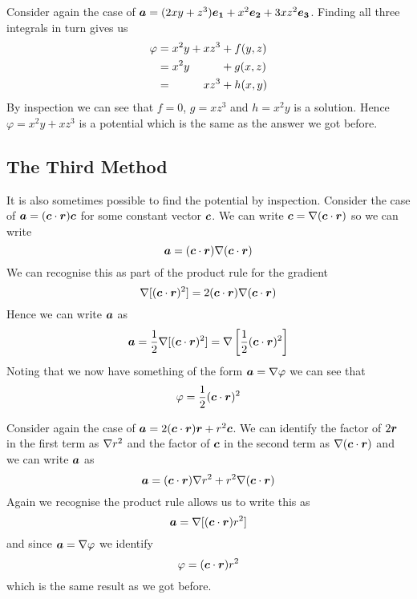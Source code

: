 \documentclass{article}
\begin{document}
    \example
    Consider again the case of \(\bm{a} = (2xy + z^3)\bm{e_{1}} + x^2\bm{e_{2}} + 3xz^2\bm{e_{3}}\).
    Finding all three integrals in turn gives us
    \begin{align*}
        \varphi &= x^2y + xz^3 + f(y, z)\\
        &= x^2y \hphantom{ + xz^3 }\;\, + g(x, z)\\
        &= \hphantom{x^2y + }\;\, xz^3 + h(x, y)
    \end{align*}
    By inspection we can see that \(f = 0\), \(g = xz^3\) and \(h = x^2y\) is a solution.
    Hence \(\varphi = x^2y + xz^3\) is a potential which is the same as the answer we got before.
    
    \subsection{The Third Method}
    It is also sometimes possible to find the potential by inspection.
    \example
    Consider the case of \(\bm{a} = (\bm{c}\cdot\bm{r})\bm{c}\) for some constant vector \(\bm{c}\).
    We can write \(\bm{c} = \nabla(\bm{c}\cdot\bm{r})\) so we can write
    \[\bm{a} = (\bm{c}\cdot\bm{r})\nabla(\bm{c}\cdot\bm{r})\]
    We can recognise this as part of the product rule for the gradient
    \[\nabla[(\bm{c}\cdot\bm{r})^2] = 2(\bm{c}\cdot\bm{r})\nabla(\bm{c}\cdot\bm{r})\]
    Hence we can write \(\bm{a}\) as
    \[\bm{a} = \frac{1}{2}\nabla[(\bm{c}\cdot\bm{r})^2] = \nabla\left[\frac{1}{2}(\bm{c}\cdot\bm{r})^2\right]\]
    Noting that we now have something of the form \(\bm{a} = \nabla\varphi\) we can see that
    \[\varphi = \frac{1}{2}(\bm{c}\cdot\bm{r})^2\]
    
    \example
    Consider again the case of \(\bm{a} = 2(\bm{c}\cdot\bm{r})\bm{r} + r^2\bm{c}\).
    We can identify the factor of \(2\bm{r}\) in the first term as \(\nabla r^2\) and the factor of \(\bm{c}\) in the second term as \(\nabla(\bm{c}\cdot\bm{r})\) and we can write \(\bm{a}\) as
    \[\bm{a} = (\bm{c}\cdot\bm{r})\nabla r^2 + r^2\nabla(\bm{c}\cdot\bm{r})\]
    Again we recognise the product rule allows us to write this as
    \[\bm{a} = \nabla[(\bm{c}\cdot\bm{r})r^2]\]
    and since \(\bm{a} = \nabla\varphi\) we identify
    \[\varphi = (\bm{c}\cdot\bm{r})r^2\]
    which is the same result as we got before.
    
\end{document}
